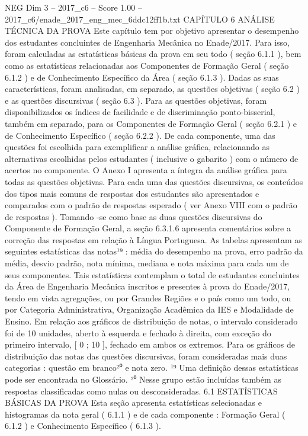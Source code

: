 \begin{textsample}{NEG Dim 3 – 2017\_c6 – Score 1.00 – 2017\_c6/enade\_2017\_eng\_mec\_6ddc12ff1b.txt}  \label{ex:f3_neg_085}
CAPÍTULO 6 ANÁLISE TÉCNICA DA PROVA Este capítulo tem por objetivo apresentar o desempenho dos estudantes concluintes de Engenharia Mecânica no Enade/2017.
Para isso, foram calculadas as estatísticas básicas da prova em seu todo ( seção 6.1.1 ), bem como as estatísticas relacionadas aos Componentes de Formação Geral ( seção 6.1.2 ) e de Conhecimento Específico da Área ( seção 6.1.3 ).
Dadas as suas características, foram analisadas, em separado, as questões objetivas ( seção 6.2 ) e as questões discursivas ( seção 6.3 ).
Para as questões objetivas, foram disponibilizados os índices de facilidade e de discriminação ponto-bisserial, também em separado, para os Componentes de Formação Geral ( seção 6.2.1 ) e de Conhecimento Específico ( seção 6.2.2 ).
De cada componente, uma das questões foi escolhida para exemplificar a análise gráfica, relacionando as alternativas escolhidas pelos estudantes ( inclusive o gabarito ) com o número de acertos no componente.
O Anexo I apresenta a íntegra da análise gráfica para todas as questões objetivas.
Para cada uma das questões discursivas, os conteúdos dos tipos mais comuns de respostas dos estudantes são apresentados e comparados com o padrão de respostas esperado ( ver Anexo VIII com o padrão de respostas ).
Tomando -se como base as duas questões discursivas do Componente de Formação Geral, a seção 6.3.1.6 apresenta comentários sobre a correção das respostas em relação à Língua Portuguesa.
As tabelas apresentam as seguintes estatísticas das notas¹⁹ : média do desempenho na prova, erro padrão da média, desvio padrão, nota mínima, mediana e nota máxima para cada um de seus componentes.
Tais estatísticas contemplam o total de estudantes concluintes da Área de Engenharia Mecânica inscritos e presentes à prova do Enade/2017, tendo em vista agregações, ou por Grandes Regiões e o país como um todo, ou por Categoria Administrativa, Organização Acadêmica da IES e Modalidade de Ensino.
Em relação aos gráficos de distribuição de notas, o intervalo considerado foi de 10 unidades, aberto à esquerda e fechado à direita, com exceção do primeiro intervalo, [ 0 ; 10 ], fechado em ambos os extremos.
Para os gráficos de distribuição das notas das questões discursivas, foram consideradas mais duas categorias : questão em branco²⁰ e nota zero. ¹⁹ Uma definição dessas estatísticas pode ser encontrada no Glossário. ²⁰ Nesse grupo estão incluídas também as respostas classificadas como nulas ou desconsideradas. 6.1 ESTATÍSTICAS BÁSICAS DA PROVA Esta seção apresenta estatísticas selecionadas e histogramas da nota geral ( 6.1.1 ) e de cada componente : Formação Geral ( 6.1.2 ) e Conhecimento Específico ( 6.1.3 ).

\end{textsample}
